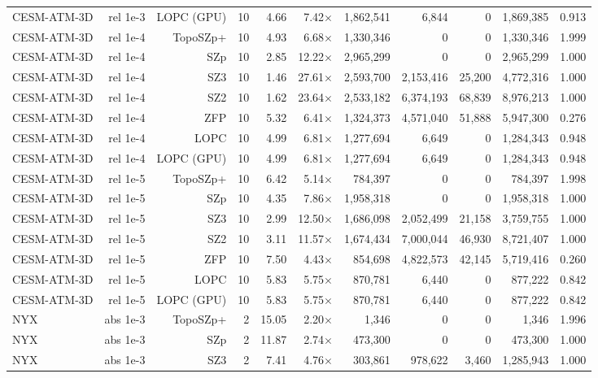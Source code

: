 \begin{tabular}{lrrrrrrrrrr}
CESM-ATM-3D & rel 1e-3 & LOPC (GPU) & 10 & 4.66 & 7.42$\times$ & 1,862,541 & 6,844 & 0 & 1,869,385 & 0.913 \\
CESM-ATM-3D & rel 1e-4 & TopoSZp+ & 10 & 4.93 & 6.68$\times$ & 1,330,346 & 0 & 0 & 1,330,346 & 1.999 \\
CESM-ATM-3D & rel 1e-4 & SZp & 10 & 2.85 & 12.22$\times$ & 2,965,299 & 0 & 0 & 2,965,299 & 1.000 \\
CESM-ATM-3D & rel 1e-4 & SZ3 & 10 & 1.46 & 27.61$\times$ & 2,593,700 & 2,153,416 & 25,200 & 4,772,316 & 1.000 \\
CESM-ATM-3D & rel 1e-4 & SZ2 & 10 & 1.62 & 23.64$\times$ & 2,533,182 & 6,374,193 & 68,839 & 8,976,213 & 1.000 \\
CESM-ATM-3D & rel 1e-4 & ZFP & 10 & 5.32 & 6.41$\times$ & 1,324,373 & 4,571,040 & 51,888 & 5,947,300 & 0.276 \\
CESM-ATM-3D & rel 1e-4 & LOPC & 10 & 4.99 & 6.81$\times$ & 1,277,694 & 6,649 & 0 & 1,284,343 & 0.948 \\
CESM-ATM-3D & rel 1e-4 & LOPC (GPU) & 10 & 4.99 & 6.81$\times$ & 1,277,694 & 6,649 & 0 & 1,284,343 & 0.948 \\
CESM-ATM-3D & rel 1e-5 & TopoSZp+ & 10 & 6.42 & 5.14$\times$ & 784,397 & 0 & 0 & 784,397 & 1.998 \\
CESM-ATM-3D & rel 1e-5 & SZp & 10 & 4.35 & 7.86$\times$ & 1,958,318 & 0 & 0 & 1,958,318 & 1.000 \\
CESM-ATM-3D & rel 1e-5 & SZ3 & 10 & 2.99 & 12.50$\times$ & 1,686,098 & 2,052,499 & 21,158 & 3,759,755 & 1.000 \\
CESM-ATM-3D & rel 1e-5 & SZ2 & 10 & 3.11 & 11.57$\times$ & 1,674,434 & 7,000,044 & 46,930 & 8,721,407 & 1.000 \\
CESM-ATM-3D & rel 1e-5 & ZFP & 10 & 7.50 & 4.43$\times$ & 854,698 & 4,822,573 & 42,145 & 5,719,416 & 0.260 \\
CESM-ATM-3D & rel 1e-5 & LOPC & 10 & 5.83 & 5.75$\times$ & 870,781 & 6,440 & 0 & 877,222 & 0.842 \\
CESM-ATM-3D & rel 1e-5 & LOPC (GPU) & 10 & 5.83 & 5.75$\times$ & 870,781 & 6,440 & 0 & 877,222 & 0.842 \\
NYX & abs 1e-3 & TopoSZp+ & 2 & 15.05 & 2.20$\times$ & 1,346 & 0 & 0 & 1,346 & 1.996 \\
NYX & abs 1e-3 & SZp & 2 & 11.87 & 2.74$\times$ & 473,300 & 0 & 0 & 473,300 & 1.000 \\
NYX & abs 1e-3 & SZ3 & 2 & 7.41 & 4.76$\times$ & 303,861 & 978,622 & 3,460 & 1,285,943 & 1.000 \\

\end{tabular}
